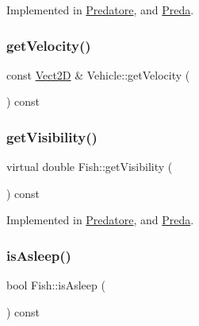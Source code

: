 Implemented in \hyperlink{classPredatore_a9317be30d28ab61d3f7472f2b1183ba3_a9317be30d28ab61d3f7472f2b1183ba3}{Predatore}, and \hyperlink{classPreda_a9f0e2e1f347466a5084f887dab6c218f_a9f0e2e1f347466a5084f887dab6c218f}{Preda}.

\mbox{\label{classVehicle_a87b8266cb3495e8444233a0724e1bf07_a87b8266cb3495e8444233a0724e1bf07}} 
\subsubsection{\texorpdfstring{get\+Velocity()}{getVelocity()}}
{\footnotesize\ttfamily const \hyperlink{classVect2D}{Vect2D} \& Vehicle\+::get\+Velocity (\begin{DoxyParamCaption}{ }\end{DoxyParamCaption}) const\hspace{0.3cm}{\ttfamily [inherited]}}

\mbox{\label{classFish_a6c20ea483d1f6237ebf01aee3f2b6e88_a6c20ea483d1f6237ebf01aee3f2b6e88}} 
\subsubsection{\texorpdfstring{get\+Visibility()}{getVisibility()}}
{\footnotesize\ttfamily virtual double Fish\+::get\+Visibility (\begin{DoxyParamCaption}{ }\end{DoxyParamCaption}) const\hspace{0.3cm}{\ttfamily [pure virtual]}}



Implemented in \hyperlink{classPredatore_a1df89e4272f6cae88ffb445d12112a09_a1df89e4272f6cae88ffb445d12112a09}{Predatore}, and \hyperlink{classPreda_a0541a146d9779d0391c0cff244964dd4_a0541a146d9779d0391c0cff244964dd4}{Preda}.

\mbox{\label{classFish_a4772391eb9a92dca61b810b40705709b_a4772391eb9a92dca61b810b40705709b}} 
\subsubsection{\texorpdfstring{is\+Asleep()}{isAsleep()}}
{\footnotesize\ttfamily bool Fish\+::is\+Asleep (\begin{DoxyParamCaption}{ }\end{DoxyParamCaption}) const}


